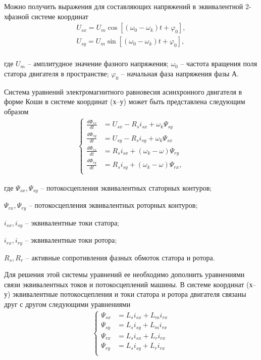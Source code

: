         Можно получить выражения для составляющих напряжений в эквивалентной
        2-хфазной системе координат
        \begin{gather*}
            U_{sx} = U_m \cos [(\omega_0 - \omega_k)t + \varphi_0],\\
            U_{sy} = U_m \sin [(\omega_0 - \omega_k)t + \varphi_0],\\
        \end{gather*}

        где $U_m$ -- амплитудное значение фазного напряжения;
        $\omega_0$ -- частота вращения поля статора двигателя в пространстве;
        $\varphi_0$ -- начальная фаза напряжения фазы А.

        Система уравнений электромагнитного равновесия асинхронного двигателя в
        форме Коши в системе координат (х–у) может быть представлена следующим
        образом
        \begin{gather*}
            \left\{
            \begin{aligned}
                \frac{d\Phi_{sx}}{dt} & = U_{sx} - R_s i_{sx} + \omega_k \Psi_{sy}\\
                \frac{d\Phi_{sy}}{dt} & = U_{sy} - R_s i_{sy} + \omega_k \Psi_{sx}\\
                \frac{d\Phi_{rx}}{dt} & = R_s i_{sx} + (\omega_k-\omega) \Psi_{ry}\\
                \frac{d\Phi_{ry}}{dt} & = R_s i_{sy} + (\omega_k-\omega) \Psi_{rx},\\
            \end{aligned}
            \right.
        \end{gather*}

        где $\Psi_{sx}, \Psi_{sy}$ -- потокосцепления эквивалентных статорных
            контуров;\par
        $\Psi_{rx}, \Psi_{ry}$ -- потокосцепления эквивалентных роторных
            контуров;\par
        $i_{sx}, i_{sy}$ -- эквивалентные  токи статора;\par
        $i_{rx}, i_{ry}$ -- эквивалентные  токи ротора;\par
        $R_s, R_r$ -- активные сопротивления фазных обмоток статора и ротора.

        Для решения этой системы уравнений ее необходимо дополнить уравнениями
        связи эквивалентных токов и потокосцеплений машины. В системе координат
        (х–у) эквивалентные потокосцепления и токи статора и ротора двигателя
        связаны друг с другом следующими уравнениями
        \begin{gather*}
            \left\{
            \begin{aligned}
                \Psi_{sx} & = L_s i_{sx} + L_m i_{rx}\\
                \Psi_{sy} & = L_s i_{sy} + L_m i_{rx}\\
                \Psi_{rx} & = L_s i_{sx} + L_r i_{rx}\\
                \Psi_{ry} & = L_s i_{sy} + L_r i_{rx}\\
            \end{aligned}
            \right.
        \end{gather*}
        
